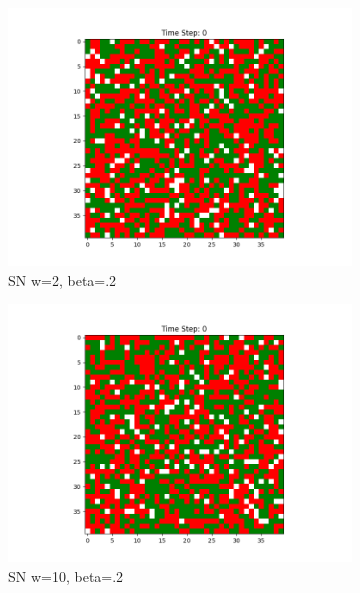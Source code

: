 \documentclass[11pt]{article}
\begin{document}
\begin{figure}[h]
\begin{subfigure}{0.14\textwidth}
			\includegraphics[width=\linewidth]{initial_cluster_w5b20.png}
			\caption{\centering SN w=2, beta=.2}
		\end{subfigure}\hfill
		\begin{subfigure}{0.14\textwidth}
			\includegraphics[width=\linewidth]{initial_cluster_w10b20.png}
			\caption{\centering SN w=10, beta=.2}
		\end{subfigure}\hfill
		\begin{subfigure}{0.14\textwidth}

\end{subfigure}
\end{figure}
\end{document}
